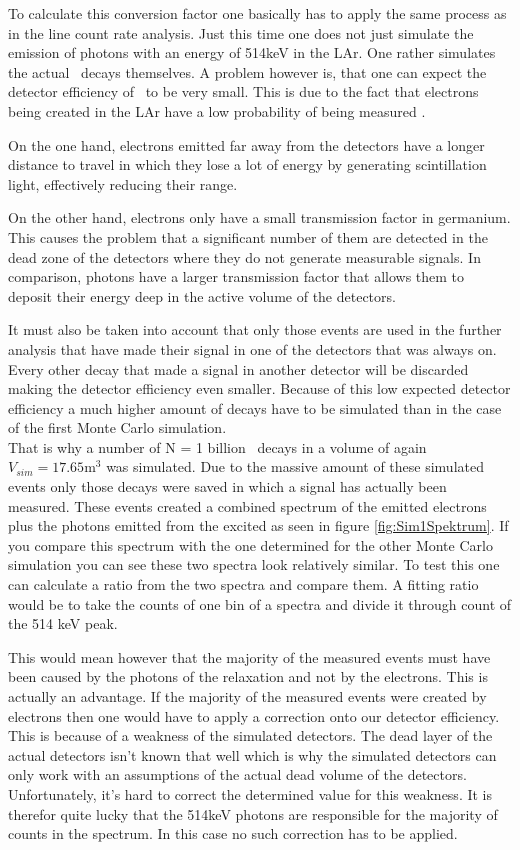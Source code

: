 \documentclass[encoding=utf8,british]{tumphthesis}
\begin{document}
To calculate this conversion factor one basically has to apply the same process as in the line count rate analysis.
Just this time one does not just simulate the emission of photons with an energy of 514keV in the LAr.
One rather simulates the actual \Kr\ decays themselves.
A problem however is, that one can expect the detector efficiency of \Kr\ to be very small.
This is due to the fact that electrons being created in the LAr have a low probability of being measured .

On the one hand, electrons emitted far away from the detectors have a longer distance to travel in which they lose a lot of energy by generating scintillation light, effectively reducing their range.

On the other hand, electrons only have a small transmission factor in germanium.
This causes the problem that a significant number of them are detected in the dead zone of the detectors where they do not generate measurable signals.
In comparison, photons have a larger transmission factor that allows them to deposit their energy deep in the active volume of the detectors.

It must also be taken into account that only those events are used in the further analysis that have made their signal in one of the detectors that was always on.
Every other decay that made a signal in another detector will be discarded making the detector efficiency even smaller. 
Because of this low expected detector efficiency a much higher amount of decays have to be simulated than in the case of the first Monte Carlo simulation.
\\

That is why a number of N = 1 billion \Kr\ decays in a volume of again $V_{sim} = 17.65 \mathrm{m}^3$ was simulated.
Due to the massive amount of these simulated events only those decays were saved in which a signal has actually been measured.
These events created a combined spectrum of the emitted electrons plus the photons emitted from the excited  as seen in figure \ref{fig:Sim1Spektrum}.
If you compare this spectrum with the one determined for the other Monte Carlo simulation you can see these two spectra look relatively similar.
To test this one can calculate a ratio from the two spectra and compare them.
A fitting ratio would be to take the counts of one bin of a spectra and divide it through count of the 514 keV peak.

This would mean however that the majority of the measured events must have been caused by the photons of the  relaxation and not by the electrons.
This is actually an advantage.
If the majority of the measured events were created by electrons then one would have to apply a correction onto our detector efficiency.
This is because of a weakness of the simulated detectors.
The dead layer of the actual detectors isn't known that well which is why the simulated detectors can only work with an assumptions of the actual dead volume of the detectors.
Unfortunately, it's hard to correct the determined value for this weakness.
It is therefor quite lucky that the 514keV photons are responsible for the majority of counts in the spectrum.
In this case no such correction has to be applied.
\\
\end{document}
